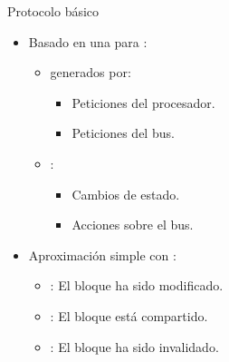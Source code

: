 \begin{frame}[t]{Protocolo básico}
\begin{itemize}
  \item Basado en una  para :
    \begin{itemize}
      \item {} generados por:
        \begin{itemize}
          \item Peticiones del procesador.
          \item Peticiones del bus.
        \end{itemize}
      \item {}:
        \begin{itemize}
          \item Cambios de estado.
          \item Acciones sobre el bus.
        \end{itemize}
    \end{itemize}

  \item Aproximación simple con :
    \begin{itemize}
      \item {}: El bloque ha sido modificado.
      \item {}: El bloque está compartido.
      \item {}: El bloque ha sido invalidado.
    \end{itemize}
\end{itemize}
\end{frame}

